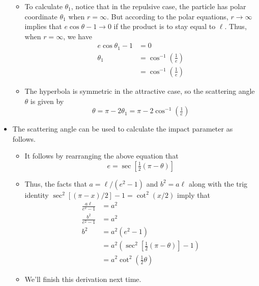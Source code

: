 \documentclass[../notes.tex]{subfiles}
\begin{document}
\begin{itemize}
\begin{itemize}
        \item To calculate $\theta_1$, notice that in the repulsive case, the particle has polar coordinate $\theta_1$ when $r=\infty$. But according to the polar equations, $r\to\infty$ implies that $e\cos\theta-1\to 0$ if the product is to stay equal to $\ell$. Thus, when $r=\infty$, we have
        \begin{align*}
            e\cos\theta_1-1 &= 0\\
            \theta_1 &= \cos^{-1}\left( \tfrac{1}{e} \right)\\
            &= \cos^{-1}\left( \tfrac{1}{e} \right)
        \end{align*}
        \item The hyperbola is symmetric in the attractive case, so the scattering angle $\theta$ is given by
        \begin{equation*}
            \theta = \pi-2\theta_1 = \pi-2\cos^{-1}\left( \tfrac{1}{e} \right)
        \end{equation*}
    \end{itemize}
    \item The scattering angle can be used to calculate the impact parameter as follows.
    \begin{itemize}
        \item It follows by rearranging the above equation that
        \begin{equation*}
            e = \sec\left[ \tfrac{1}{2}(\pi-\theta) \right]
        \end{equation*}
        \item Thus, the facts that $a=\ell/(e^2-1)$ and $b^2=a\ell$ along with the trig identity $\sec^2[(\pi-x)/2]-1=\cot^2(x/2)$ imply that
        \begin{align*}
            \frac{a\ell}{e^2-1} &= a^2\\
            \frac{b^2}{e^2-1} &= a^2\\
            b^2 &= a^2(e^2-1)\\
            &= a^2(\sec^2\left[ \tfrac{1}{2}(\pi-\theta) \right]-1)\\
            &= a^2\cot^2\left( \tfrac{1}{2}\theta \right)
        \end{align*}
        \item We'll finish this derivation next time.
    \end{itemize}
\end{itemize}
\end{document}
